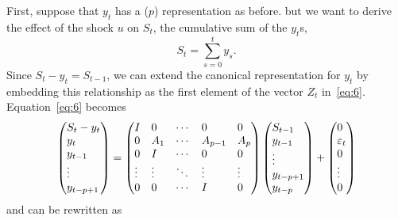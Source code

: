 \documentclass[12pt,fleqn]{article}
\begin{document}
First, suppose that $y_t$ has a \VAR($p$) representation as before.
but we want to derive the effect of the shock $u$ on $S_t$, the
cumulative sum of the $y_t$s,
\[
  S_t = \sum_{s=0}^t y_s.
\]
Since $S_t - y_t = S_{t-1}$, we can extend the canonical
representation for $y_t$ by embedding this relationship as the first
element of the vector $Z_t$ in~\eqref{eq:6}. Equation~\eqref{eq:6}
becomes
\begin{equation*}
  \begin{pmatrix*}[l]
    S_t - y_t \\ y_t \\ y_{t-1} \\ \vdots \\ y_{t-p+1}
  \end{pmatrix*}
  =
  \begin{pmatrix*}[l]
    I      & 0      & \cdots & 0       & 0      \\
    0      & A_1    & \cdots & A_{p-1} & A_p    \\
    0      & I      & \cdots & 0       & 0      \\
    \vdots & \vdots & \ddots & \vdots  & \vdots \\
    0      & 0      & \cdots & I       & 0
  \end{pmatrix*}
  \begin{pmatrix*}[l]
    S_{t-1}  \\ y_{t-1} \\ \vdots \\ y_{t-p+1} \\ y_{t-p}
  \end{pmatrix*}
  +
  \begin{pmatrix*}[l]
    0 \\ \vep_t \\ 0 \\ \vdots \\ 0
  \end{pmatrix*}
\end{equation*}
and can be rewritten as
\end{document}
